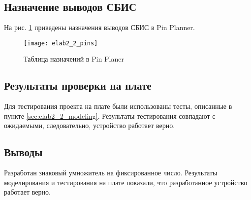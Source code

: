 \subsection{Назначение выводов СБИС}

На рис. \ref{fig:elab2_2_pins} приведены назначения выводов СБИС в Pin Planner.

\begin{figure}[H]
\begin{center}
	\texttt{[image: elab2\_2\_pins]}
	\caption{Таблица назначений в Pin Planer}
	\label{fig:elab2_2_pins}
\end{center}
\end{figure}

\subsection{Результаты проверки на плате}

Для тестирования проекта на плате были использованы тесты, описанные в пункте \ref{sec:elab2_2_modeling}. Результаты тестирования совпадают с ожидаемыми, следовательно, устройство работает верно.

\subsection{Выводы}

Разработан знаковый умножитель на фиксированное число. Результаты моделирования и тестирования на плате показали, что разработанное устройство работает верно.

